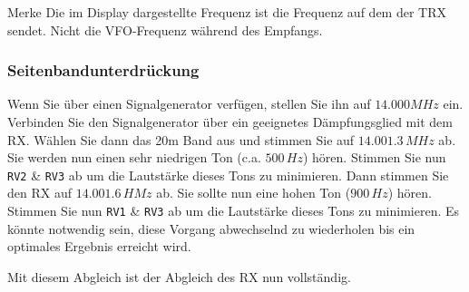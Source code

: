 \documentclass[10pt, a4paper,twoside]{scrartcl}
\newenvironment{remember}{\begin{bclogo}[couleur=blue!30,arrondi=.1,logo=\bccrayon,ombre=true]{Merke}}{\end{bclogo}}
\begin{document}
\begin{remember}
Die im Display dargestellte Frequenz ist die Frequenz auf dem der TRX sendet. Nicht die VFO-Frequenz während des Empfangs.
\end{remember}

\subsubsection{Seitenbandunterdrückung}
Wenn Sie über einen Signalgenerator verfügen, stellen Sie ihn auf $14.000 MHz$ ein. Verbinden Sie den Signalgenerator über ein geeignetes Dämpfungsglied mit dem RX. Wählen Sie dann das 20m Band aus und stimmen Sie auf $14.001.3\,MHz$ ab. Sie werden nun einen sehr niedrigen Ton (c.a. $500\,Hz$) hören. Stimmen Sie nun \texttt{RV2} \& \texttt{RV3} ab um die Lautstärke dieses Tons zu minimieren. Dann stimmen Sie den RX auf $14.001.6\,HMz$ ab. Sie sollte nun eine hohen Ton ($900\,Hz$) hören. Stimmen Sie nun \texttt{RV1} \& \texttt{RV3} ab um die Lautstärke dieses Tons zu minimieren. Es könnte notwendig sein, diese Vorgang abwechselnd zu wiederholen bis ein optimales Ergebnis erreicht wird.

Mit diesem Abgleich ist der Abgleich des RX nun vollständig. 

\clearpage
\end{document}
